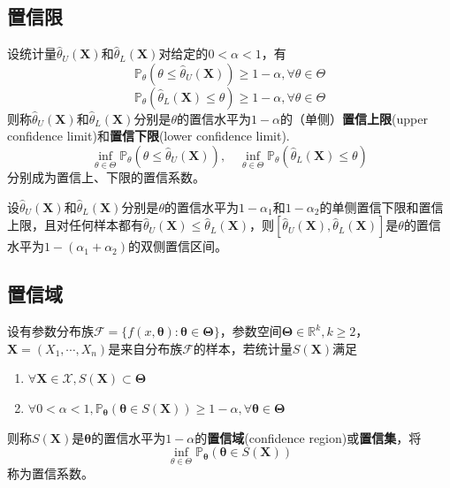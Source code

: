\documentclass{ctexbook}
\begin{document}
\subsection{置信限}

\begin{definition}[置信限]
    设统计量$\hat{\theta}_U(\mathbf{X})$和$\hat{\theta}_L(\mathbf{X})$对给定的$0<\alpha<1$，有
    $$\mathbb{P}_\theta(\theta\le \hat{\theta}_U(\mathbf{X}))\ge 1-\alpha,\forall\theta\in\Theta$$
    $$\mathbb{P}_\theta(\hat{\theta}_L(\mathbf{X})\le\theta)\ge 1-\alpha,\forall\theta\in\Theta$$
    则称$\hat{\theta}_U(\mathbf{X})$和$\hat{\theta}_L(\mathbf{X})$分别是$\theta$的置信水平为$1-\alpha$的（单侧）\textbf{置信上限}(upper confidence limit)和\textbf{置信下限}(lower confidence limit).
    $$\inf_{\theta\in\Theta}\mathbb{P}_\theta(\theta\le \hat{\theta}_U(\mathbf{X})),\quad\inf_{\theta\in\Theta}\mathbb{P}_\theta(\hat{\theta}_L(\mathbf{X})\le\theta)$$
    分别成为置信上、下限的置信系数。
\end{definition}

\begin{lemma}
    设$\hat{\theta}_U(\mathbf{X})$和$\hat{\theta}_L(\mathbf{X})$分别是$\theta$的置信水平为$1-\alpha_1$和$1-\alpha_2$的单侧置信下限和置信上限，且对任何样本都有$\hat{\theta}_U(\mathbf{X})\le\hat{\theta}_L(\mathbf{X})$，则$[\hat{\theta}_U(\mathbf{X}),\hat{\theta}_L(\mathbf{X})]$是$\theta$的置信水平为$1-(\alpha_1+\alpha_2)$的双侧置信区间。
\end{lemma}

\subsection{置信域}

\begin{definition}[置信域]
    设有参数分布族$\mathcal{F}=\{f(x,\boldsymbol{\theta}):\boldsymbol{\theta}\in\boldsymbol{\Theta}\}$，参数空间$\boldsymbol{\Theta}\in\mathbb{R}^k,k\ge 2$，$\mathbf{X}=(X_1,\cdots,X_n)$是来自分布族$\mathcal{F}$的样本，若统计量$S(\mathbf{X})$满足\begin{enumerate}
        \item $\forall\mathbf{X}\in\mathcal{X},S(\mathbf{X})\subset\boldsymbol{\Theta}$
        \item $\forall 0<\alpha<1,\mathbb{P}_{\boldsymbol{\theta}}(\boldsymbol{\theta}\in S(\mathbf{X}))\ge 1-\alpha,\forall\boldsymbol{\theta}\in\boldsymbol{\Theta}$
    \end{enumerate}
    则称$S(\mathbf{X})$是$\boldsymbol{\theta}$的置信水平为$1-\alpha$的\textbf{置信域}(confidence region)或\textbf{置信集}，将
    $$\inf_{\theta\in\Theta}\mathbb{P}_{\boldsymbol{\theta}}(\boldsymbol{\theta}\in S(\mathbf{X}))$$
    称为置信系数。
\end{definition}
\end{document}
